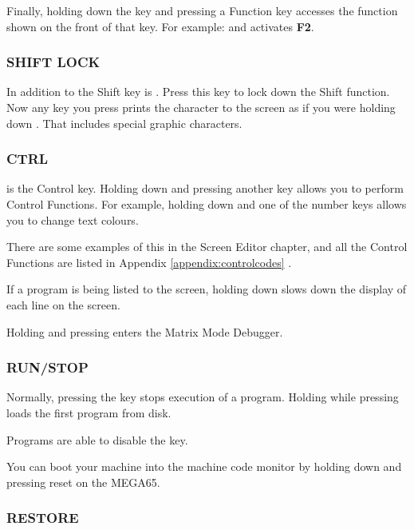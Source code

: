 Finally, holding down the  key and pressing a Function key accesses the function shown on the front of that key. For example:  and  activates \textbf{F2}.


\subsubsection{SHIFT LOCK}

In addition to the Shift key is . Press this key to lock down the Shift function. Now any key you press prints the character to the screen as if you were holding down . That includes special graphic characters.

\subsubsection{CTRL}

 is the Control key. Holding down  and pressing another key allows you to perform Control Functions. For example, holding down  and one of the number keys allows you to change text colours.

There are some examples of this in the Screen Editor chapter, and all the Control Functions are listed in Appendix \ref{appendix:controlcodes}  .

If a program is being listed to the screen, holding down  slows down the display of each line on the screen.

Holding  and pressing \megakey{*} enters the Matrix Mode Debugger.

\subsubsection{RUN/STOP}

Normally, pressing the  key stops execution of a program. Holding  while pressing  loads the first program from disk.

Programs are able to disable the  key.

You can boot your machine into the machine code monitor by holding down  and pressing reset on the MEGA65.

\subsubsection{RESTORE}

